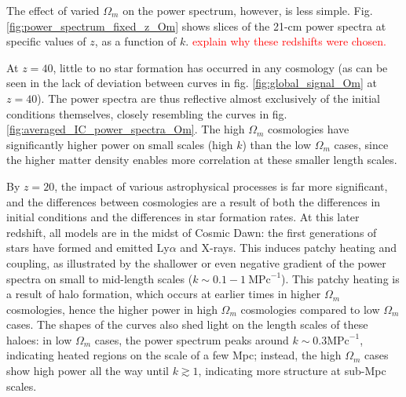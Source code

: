 \documentclass[floats,floatfix,showpacs,amssymb,prd,superscriptaddress,nofootinbib]{revtex4-2} %
\newcommand{\red}{\textcolor{red}}
\begin{document}



The effect of varied $\Omega_m$ on the power spectrum, however, is less simple. Fig. \ref{fig:power_spectrum_fixed_z_Om} shows slices of the 21-cm power spectra at specific values of $z$, as a function of $k$. \red{explain why these redshifts were chosen.}

At $z = 40$, little to no star formation has occurred in any cosmology (as can be seen in the lack of deviation between curves in fig. \ref{fig:global_signal_Om} at $z = 40$). The power spectra are thus reflective almost exclusively of the initial conditions themselves, closely resembling the curves in fig. \ref{fig:averaged_IC_power_spectra_Om}.
The high $\Omega_m$ cosmologies have significantly higher power on small scales (high $k$) than the low $\Omega_m$ cases, since the higher matter density enables more correlation at these smaller length scales. 

By $z = 20$, the impact of various astrophysical processes is far more significant, and the differences between cosmologies are a result of both the differences in initial conditions and the differences in star formation rates. At this later redshift, all models are in the midst of Cosmic Dawn: the first generations of stars have formed and emitted Ly$\alpha$ and X-rays. This induces patchy heating and coupling, as illustrated by the shallower or even negative gradient of the power spectra on small to mid-length scales ($k \sim 0.1 - 1 ~\text{MPc}^{-1}$). This patchy heating is a result of halo formation, which occurs at earlier times in higher $\Omega_m$ cosmologies, hence the higher power in high $\Omega_m$ cosmologies compared to low $\Omega_m$ cases. The shapes of the curves also shed light on the length scales of these haloes: in low $\Omega_m$ cases, the power spectrum peaks around $k \sim 0.3 \text{MPc}^{-1}$, indicating heated regions on the scale of a few Mpc; instead, the high $\Omega_m$ cases show high power all the way until $k \gtrsim 1$, indicating more structure at sub-Mpc scales. 
\end{document}
